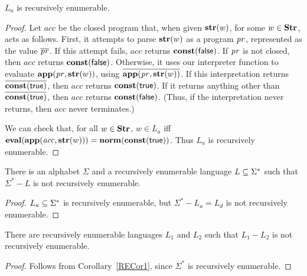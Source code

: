 \begin{theorem}
$L_a$ is recursively enumerable.
\end{theorem}

\begin{proof}
Let $\mathit{acc}$ be the closed program that, when given $\mathbf{str}(w)$, for
some $w\in\mathbf{Str}$, acts as follows.  First, it attempts to parse
$\mathbf{str}(w)$ as a program $\mathit{pr}$, represented as the value
$\overline{\mathit{pr}}$.  If this attempt fails, $\mathit{acc}$ returns
$\mathbf{const}(\mathsf{false})$.  If $\mathit{pr}$ is not closed, then $\mathit{acc}$
returns $\mathbf{const}(\mathsf{false})$.  Otherwise, it uses our interpreter
function to evaluate $\mathbf{app}(\mathit{pr},\mathbf{str}(w))$, using
$\overline{\mathbf{app}(\mathit{pr},\mathbf{str}(w))}$.  If this interpretation
returns $\overline{\mathbf{const}(\mathsf{true})}$, then $\mathit{acc}$ returns
$\mathbf{const}(\mathsf{true})$.  If it returns anything other than
$\overline{\mathbf{const}(\mathsf{true})}$, then $\mathit{acc}$ returns
$\mathbf{const}(\mathsf{false})$.  (Thus, if the interpretation never returns,
then $\mathit{acc}$ never terminates.)

We can check that, for all $w\in\mathbf{Str}$, $w\in L_a$ iff
$\mathbf{eval}(\mathbf{app}(\mathit{acc},\mathbf{str}(w))) =
\mathbf{norm}(\mathbf{const}(\mathsf{true}))$.  Thus $L_a$ is recursively enumerable.
\end{proof}

\begin{corollary}
\label{RECor1}

There is an alphabet $\Sigma$ and a recursively enumerable language
$L\subseteq\Sigma^*$ such that $\Sigma^*-L$ is not recursively enumerable.
\end{corollary}
%
%

\begin{proof}
$L_a\subseteq\Sigma^*$ is recursively enumerable, but
$\Sigma^*-L_a=L_d$ is not recursively enumerable.
\end{proof}

\begin{corollary}
\label{RECor2}

%
%
There are recursively enumerable languages $L_1$ and $L_2$
such that $L_1-L_2$ is not recursively enumerable.
\end{corollary}

\begin{proof}
Follows from Corollary~\ref{RECor1}, since $\Sigma^*$ is
recursively enumerable.
\end{proof}


